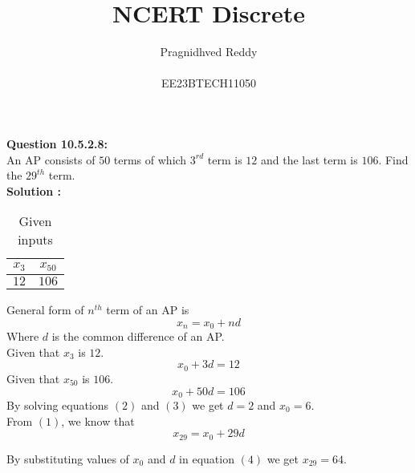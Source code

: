 \documentclass[12pt]{article}
\title{NCERT Discrete}
\author{Pragnidhved Reddy\\\\EE23BTECH11050}
\date{}
\begin{document}
\maketitle
\textbf{Question 10.5.2.8:}\\
An AP consists of $50$ terms of which $3^{rd}$ term is $12$ and the last term is $106$. Find the $29^{th}$ term.\\
\textbf{Solution :}\\
\begin{table}[H]
\centering
\begin{tabular}{|c|c|}\hline
$x_3$ & $x_{50}$\\ \hline
$12$ & $106$ \\ \hline
\end{tabular}
\caption{Given inputs}
\end{table}
General form of $n^{th}$ term of an AP is\\
\begin{equation}
x_n=x_0+nd
\end{equation}
Where $d$ is the common difference of an AP.\\
Given that $x_3$ is $12$.\\
\begin{equation}
 x_0+3d=12
 \end{equation}
 Given that $x_{50}$ is $106$.\\
 \begin{equation}
x_0+50d=106
 \end{equation}
 By solving equations $(2)$ and $(3)$ we get $d=2$ and $x_0=6.$\\
 From $(1)$, we know that
 \begin{equation}
 x_{29}=x_0+29d
 \end{equation}
 
 By substituting values of $x_0$ and $d$ in equation $(4)$ we get $x_{29}=64$.
 
\end{document}
